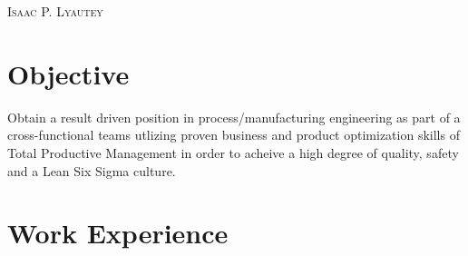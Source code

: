 \documentclass[a4paper, oneside, final, fontsize=9pt, usegeometry]{scrartcl} %
\begin{document}

\begin{center} %


{\fontsize{36}{36}\selectfont\scshape Isaac P. Lyautey}


\section{Objective}
\begin{center}
    Obtain a result driven position in process/manufacturing engineering as part of a cross-functional teams utlizing proven business and product optimization skills of Total Productive Management in order to acheive a high degree of quality, safety and a Lean Six Sigma culture.
\end{center}

\vspace{-12pt}


\section{Work Experience}



\end{center}
\end{document}
